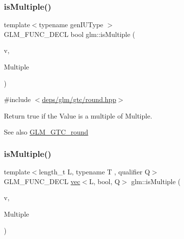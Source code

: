 \mbox{\label{group__gtc__round_gaec593d33956a8fe43f78fccc63ddde9a}} 
\subsubsection{\texorpdfstring{is\+Multiple()}{isMultiple()}\hspace{0.1cm}{\footnotesize\ttfamily [1/3]}}
{\footnotesize\ttfamily template$<$typename gen\+I\+U\+Type $>$ \\
G\+L\+M\+\_\+\+F\+U\+N\+C\+\_\+\+D\+E\+CL bool glm\+::is\+Multiple (\begin{DoxyParamCaption}\item[{gen\+I\+U\+Type}]{v,  }\item[{gen\+I\+U\+Type}]{Multiple }\end{DoxyParamCaption})}



{\ttfamily \#include $<$\hyperlink{round_8hpp}{deps/glm/gtc/round.\+hpp}$>$}

Return true if the \textquotesingle{}Value\textquotesingle{} is a multiple of \textquotesingle{}Multiple\textquotesingle{}.

\begin{DoxySeeAlso}{See also}
\hyperlink{group__gtc__round}{G\+L\+M\+\_\+\+G\+T\+C\+\_\+round} 
\end{DoxySeeAlso}
\mbox{\label{group__gtc__round_ga354caf634ef333d9cb4844407416256a}} 
\subsubsection{\texorpdfstring{is\+Multiple()}{isMultiple()}\hspace{0.1cm}{\footnotesize\ttfamily [2/3]}}
{\footnotesize\ttfamily template$<$length\+\_\+t L, typename T , qualifier Q$>$ \\
G\+L\+M\+\_\+\+F\+U\+N\+C\+\_\+\+D\+E\+CL \hyperlink{structglm_1_1vec}{vec}$<$L, bool, Q$>$ glm\+::is\+Multiple (\begin{DoxyParamCaption}\item[{\hyperlink{structglm_1_1vec}{vec}$<$ L, T, Q $>$ const \&}]{v,  }\item[{T}]{Multiple }\end{DoxyParamCaption})}



